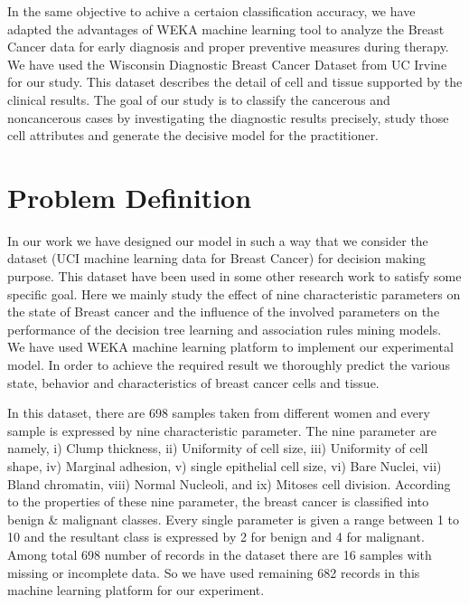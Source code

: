 \documentclass[conference]{IEEEtran}
\begin{document}
In the same objective to achive a certaion classification accuracy, we have adapted the advantages of WEKA machine learning tool to analyze the Breast Cancer data for early diagnosis and proper preventive measures during therapy. We have used the Wisconsin Diagnostic Breast Cancer  Dataset from UC Irvine\cite{IEEEhowto:uci} for our study. This dataset describes the detail of cell and tissue supported by the clinical results.  The goal of our study is to classify the cancerous and noncancerous cases by investigating the diagnostic results precisely, study those cell attributes and generate the decisive model for the practitioner.

%
% 
%
%
%

\section{Problem Definition}
In our work we have designed our model in such a way that we consider the dataset (UCI machine learning data for Breast Cancer) for decision making purpose. This dataset have been used in some other research work to satisfy some specific goal. Here we mainly study the effect of nine characteristic parameters on the state of Breast cancer and the influence of the involved parameters on the performance of the decision tree learning and association rules mining models. We have used WEKA machine learning platform to implement our experimental model. In order to achieve the required result we thoroughly predict the various state, behavior and characteristics of breast cancer cells and tissue.

In this dataset, there are 698 samples taken from different women and every sample is expressed by nine characteristic parameter. The nine parameter are namely, i) Clump thickness, ii) Uniformity of cell size, iii) Uniformity of cell shape, iv) Marginal adhesion, v) single epithelial cell size, vi) Bare Nuclei, vii) Bland chromatin, viii) Normal Nucleoli, and ix) Mitoses cell division. According to the properties of these nine parameter, the breast cancer is classified into benign \& malignant classes. Every single parameter is given a range between 1 to 10 and the resultant class is expressed by 2 for benign and 4 for malignant. Among total 698 number of records in the dataset there are 16 samples with missing or incomplete data. So we have used remaining 682 records in this machine learning platform for our experiment.
\end{document}
